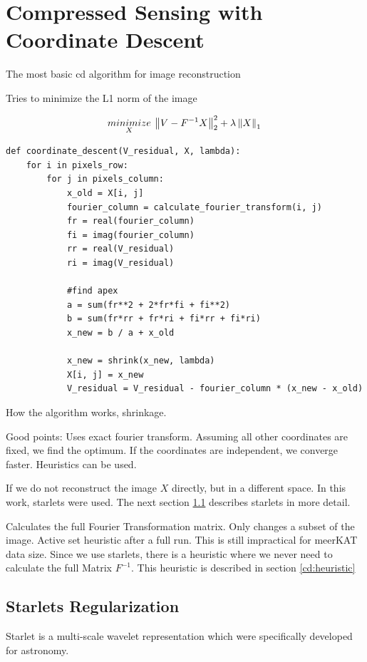 \section{Compressed Sensing with Coordinate Descent}
The most basic cd algorithm for image reconstruction

Tries to minimize the L1 norm of the image

\begin{equation}
	\underset{X}{minimize} \: \left \| V - F^{-1}X \right \|_2^2 + \lambda \left \| X \right \|_1 \\
\end{equation}

\begin{lstlisting} 
def coordinate_descent(V_residual, X, lambda):
	for i in pixels_row:
		for j in pixels_column:
			x_old = X[i, j]
			fourier_column = calculate_fourier_transform(i, j)
			fr = real(fourier_column)
			fi = imag(fourier_column)
			rr = real(V_residual)
			ri = imag(V_residual)
			
			#find apex
			a = sum(fr**2 + 2*fr*fi + fi**2)
			b = sum(fr*rr + fr*ri + fi*rr + fi*ri)
			x_new = b / a + x_old
			
			x_new = shrink(x_new, lambda)
			X[i, j] = x_new
			V_residual = V_residual - fourier_column * (x_new - x_old)
\end{lstlisting}\label{cd:basic}

How the algorithm works, shrinkage. 

Good points: Uses exact fourier transform. Assuming all other coordinates are fixed, we find the optimum. If the coordinates are independent, we converge faster. Heuristics can be used.

If we do not reconstruct the image $X$ directly, but in a different space. In this work, starlets were used. The next section \ref{cd:starlets} describes starlets in more detail.

Calculates the full Fourier Transformation matrix. Only changes a subset of the image. Active set heuristic after a full run. This is still impractical for meerKAT data size. Since we use starlets, there is a heuristic where we never need to calculate the full Matrix $F^{-1}$. This heuristic is described in section \ref{cd:heuristic}



\subsection{Starlets Regularization} \label{cd:starlets}
Starlet is a multi-scale wavelet representation which were specifically developed for astronomy.


